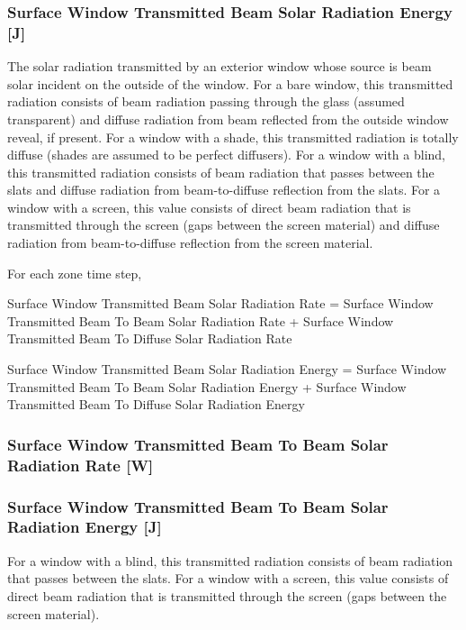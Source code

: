 \subsubsection{Surface Window Transmitted Beam Solar Radiation Energy {[}J{]}}\label{surface-window-transmitted-beam-solar-radiation-energy-j}

The solar radiation transmitted by an exterior window whose source is beam solar incident on the outside of the window. For a bare window, this transmitted radiation consists of beam radiation passing through the glass (assumed transparent) and diffuse radiation from beam reflected from the outside window reveal, if present. For a window with a shade, this transmitted radiation is totally diffuse (shades are assumed to be perfect diffusers). For a window with a blind, this transmitted radiation consists of beam radiation that passes between the slats and diffuse radiation from beam-to-diffuse reflection from the slats. For a window with a screen, this value consists of direct beam radiation that is transmitted through the screen (gaps between the screen material) and diffuse radiation from beam-to-diffuse reflection from the screen material.

For each zone time step,

Surface Window Transmitted Beam Solar Radiation Rate = Surface Window Transmitted Beam To Beam Solar Radiation Rate + Surface Window Transmitted Beam To Diffuse Solar Radiation Rate

Surface Window Transmitted Beam Solar Radiation Energy = Surface Window Transmitted Beam To Beam Solar Radiation Energy + Surface Window Transmitted Beam To Diffuse Solar Radiation Energy

\subsubsection{Surface Window Transmitted Beam To Beam Solar Radiation Rate {[}W{]}}\label{surface-window-transmitted-beam-to-beam-solar-radiation-rate-w}

\subsubsection{Surface Window Transmitted Beam To Beam Solar Radiation Energy {[}J{]}}\label{surface-window-transmitted-beam-to-beam-solar-radiation-energy-j}

For a window with a blind, this transmitted radiation consists of beam radiation that passes between the slats. For a window with a screen, this value consists of direct beam radiation that is transmitted through the screen (gaps between the screen material).

